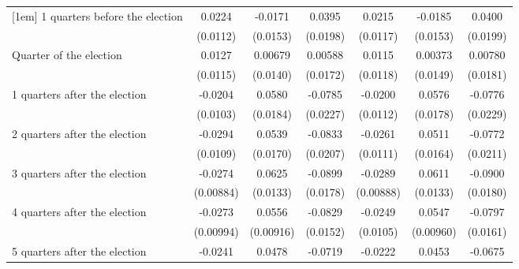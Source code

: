 \begin{table}[!ht]
\begin{tabular}{l*{6}{c}}
[1em]
 1 quarters before the election&      0.0224\sym{*}  &     -0.0171         &      0.0395\sym{*}  &      0.0215         &     -0.0185         &      0.0400\sym{*}  \\
                    &    (0.0112)         &    (0.0153)         &    (0.0198)         &    (0.0117)         &    (0.0153)         &    (0.0199)         \\
[1em]
Quarter of the election&      0.0127         &     0.00679         &     0.00588         &      0.0115         &     0.00373         &     0.00780         \\
                    &    (0.0115)         &    (0.0140)         &    (0.0172)         &    (0.0118)         &    (0.0149)         &    (0.0181)         \\
[1em]
 1 quarters after the election&     -0.0204\sym{*}  &      0.0580\sym{**} &     -0.0785\sym{***}&     -0.0200         &      0.0576\sym{**} &     -0.0776\sym{***}\\
                    &    (0.0103)         &    (0.0184)         &    (0.0227)         &    (0.0112)         &    (0.0178)         &    (0.0229)         \\
[1em]
 2 quarters after the election&     -0.0294\sym{**} &      0.0539\sym{**} &     -0.0833\sym{***}&     -0.0261\sym{*}  &      0.0511\sym{**} &     -0.0772\sym{***}\\
                    &    (0.0109)         &    (0.0170)         &    (0.0207)         &    (0.0111)         &    (0.0164)         &    (0.0211)         \\
[1em]
 3 quarters after the election&     -0.0274\sym{**} &      0.0625\sym{***}&     -0.0899\sym{***}&     -0.0289\sym{**} &      0.0611\sym{***}&     -0.0900\sym{***}\\
                    &   (0.00884)         &    (0.0133)         &    (0.0178)         &   (0.00888)         &    (0.0133)         &    (0.0180)         \\
[1em]
 4 quarters after the election&     -0.0273\sym{**} &      0.0556\sym{***}&     -0.0829\sym{***}&     -0.0249\sym{*}  &      0.0547\sym{***}&     -0.0797\sym{***}\\
                    &   (0.00994)         &   (0.00916)         &    (0.0152)         &    (0.0105)         &   (0.00960)         &    (0.0161)         \\
[1em]
 5 quarters after the election&     -0.0241\sym{*}  &      0.0478\sym{**} &     -0.0719\sym{***}&     -0.0222\sym{*}  &      0.0453\sym{**} &     -0.0675\sym{***}\\

\end{tabular}
\end{table}
